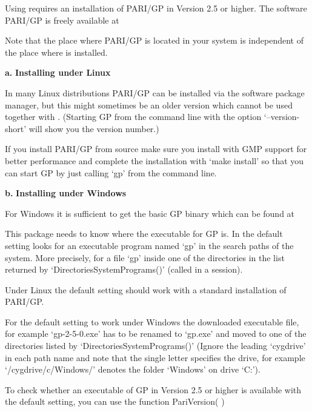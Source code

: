 Using {\Alnuth} requires an installation of PARI/GP in Version 2.5 or
higher. The software PARI/GP is freely available at

Note that the place where PARI/GP is located in your system is
independent of the place where {\Alnuth} is installed.

\beginlist
\item{\bf a.} 
{\bf Installing under Linux}

In many Linux distributions PARI/GP can be installed via the software
package manager, but this might sometimes be an older version which
cannot be used together with {\Alnuth}. (Starting GP from the command line
with the option `--version-short' will show you the version number.)

If you install PARI/GP from source make sure you install with GMP
support for better performance and complete the installation with
`make install' so that you can start GP by just calling `gp' from the
command line.

\item{\bf b.} 
{\bf Installing under Windows}

For Windows it is sufficient to get the basic GP binary which can be found at
\endlist


This package needs to know where the executable for GP is. In the
default setting {\Alnuth} looks for an executable program named `gp' in
the search paths of the system. More precisely, for a file `gp' inside
one of the directories in the list returned by
`DirectoriesSystemPrograms()' (called in a {\GAP} session).

Under Linux the default setting should work with a standard
installation of PARI/GP.

For the default setting to work under Windows the downloaded
executable file, for example `gp-2-5-0.exe' has to be renamed to
`gp.exe' and moved to one of the directories listed by
`DirectoriesSystemPrograms()' (Ignore the leading `cygdrive' in each
path name and note that the single letter specifies the drive, for
example `/cygdrive/c/Windows/' denotes the folder `Windows' on drive
`C:').

To check whether an executable of GP in Version 2.5 or higher is
available with the default setting, you can use the function
\> PariVersion( )

